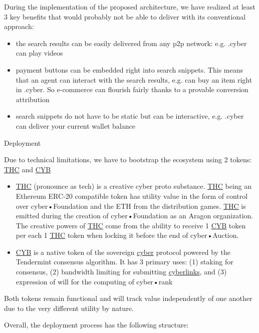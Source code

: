 \documentclass[8pt,oneside]{amsart}
\makeatletter
\newcommand{\linkred}[2]{\href{#1}{\color{red}{#2}}}
\renewcommand\subsection{\@startsection{subsection}
                                    {2}{\z@}
                                    {-3.25ex\@plus -1ex \@minus -.2ex}
                                    {0ex \@plus .2ex}
                                    {\play\Large}
                        }
\newcommand{\titleSection}[1]{\subsection{#1}}
\makeatother
\begin{document}
During the implementation of the proposed architecture, we have realized at least 3 key benefits that \linkred{https://google.com}{Google} would probably not be able to deliver with its conventional approach:

\begin{itemize}
\item the search results can be easily delivered from any p2p network: e.g. .cyber can play videos
\item payment buttons can be embedded right into search snippets. This means that an agent can interact with the search results, e.g. can buy an item right in .cyber. So e-commerce can flourish fairly thanks to a provable conversion attribution
\item search snippets do not have to be static but can be interactive, e.g. .cyber can deliver your current wallet balance
\end{itemize}

\titleSection{Deployment}\label{deployment}

Due to technical limitations, we have to bootstrap the ecosystem using 2 tokens: {\hyperref[thc]{THC}} and {\hyperref[cyb]{CYB}}

\begin{itemize}
\item {\hyperref[thc]{THC}} (pronounce as tech) is a creative cyber proto substance. {\hyperref[thc]{THC}} being an Ethereum ERC-20 compatible token has utility value in the form of control over cyber•Foundation and the ETH from the distribution games. {\hyperref[thc]{THC}} is emitted during the creation of cyber•Foundation as an Aragon organization. The creative powers of {\hyperref[thc]{THC}} come from the ability to receive 1 {\hyperref[cyb]{CYB}} token per each 1 {\hyperref[thc]{THC}} token when locking it before the end of cyber•Auction.
\item {\hyperref[cyb]{CYB}} is a native token of the sovereign {\hyperref[cyber]{cyber}} protocol powered by the Tendermint consensus algorithm. It has 3 primary uses: (1) staking for consensus, (2) bandwidth limiting for submitting {\hyperref[cyberlinks]{cyberlinks}}, and (3) expression of will for the computing of cyber•rank
\end{itemize}

Both tokens remain functional and will track value independently of one another due to the very different utility by nature.

Overall, the deployment process has the following structure:
\end{document}
